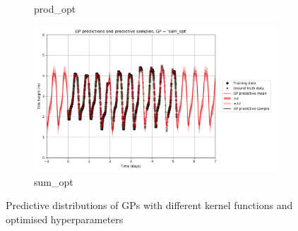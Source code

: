 \documentclass{article}
\begin{document}
\begin{figure}[pht]
\begin{subfigure}{0.45\textwidth}
        \caption{prod\_opt}
        \label{fig:pred_samples_prod_opt}
    \end{subfigure}
    \begin{subfigure}{0.45\textwidth}
        \centering
        \includegraphics[width=\textwidth]{GP_predictions_and_predictive_samples,_GP____sum_opt_.png}
        \caption{sum\_opt}
        \label{fig:pred_samples_sum_opt}
    \end{subfigure}

    \caption{Predictive distributions of GPs with different kernel functions and optimised hyperparameters}
    \label{fig:opt}
\end{figure}
\end{document}
